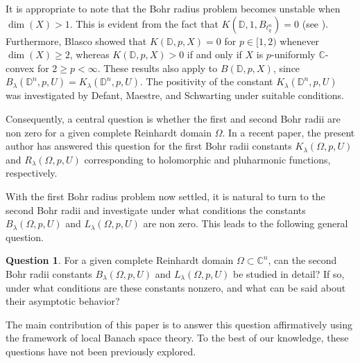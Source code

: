 \documentclass[a4paper,11pt, reqno]{amsart}
\theoremstyle{definition}
\newtheorem{qsn}{Question} [section]
\begin{document}
	It is appropriate to note that the Bohr radius problem becomes unstable when $\dim(X)>1$. This is evident from the fact that $K(\mathbb{D},1,B_{\ell^n_q})=0$ (see \cite{Blasco-OTAA-2010}). Furthermore, Blasco \cite{Blasco-Collect-2017} showed that $K(\mathbb{D},p,X)=0$ for $p \in [1,2)$ whenever $\dim (X) \geq 2$, whereas $K(\mathbb{D},p,X)>0$ if and only if $X$ is $p$-uniformly $\mathbb{C}$-convex for $2 \geq p < \infty$. These results also apply to $B(\mathbb{D},p,X)$, since $B_{\lambda}(\mathbb{D}^n, p,U) = K_{\lambda}(\mathbb{D}^n, p,U)$.
	The positivity of the
	constant $K_{\lambda}(\mathbb{D}^n, p,U)$ was investigated by Defant, Maestre, and Schwarting \cite{defant-2011} under suitable conditions. 
	\par
	Consequently, a central question is whether the first and second Bohr radii are non zero for a given complete Reinhardt domain $\Omega$. In a recent paper, the present author \cite{Himadri-local-Banach-1} has answered this question for the first Bohr radii constants $K_{\lambda}(\Omega, p,U)$ and $R_{\lambda}(\Omega, p,U)$ corresponding to holomorphic and pluharmonic functions, respectively.
	\vspace{0.5mm}
	
	 With the first Bohr radius problem now settled, it is natural to turn to the second Bohr radii and investigate under what conditions the constants $B_{\lambda}(\Omega, p,U)$ and $L_{\lambda}(\Omega, p,U)$ are non zero. This leads to the following general question.
	 \begin{qsn} \label{qsn-1.3}
	 	For a given complete Reinhardt domain $\Omega \subset \mathbb{C}^n$, can the second Bohr radii constants $B_{\lambda}(\Omega, p,U)$ and $L_{\lambda}(\Omega, p,U)$ be studied in detail? If so, under what conditions are these constants nonzero, and what can be said about their asymptotic behavior?
	 \end{qsn}  
	The main contribution of this paper is to answer this question affirmatively using the framework of local Banach space theory. To the best of our knowledge, these questions have not been previously explored. 
	\vspace{1mm}
	
\end{document}
